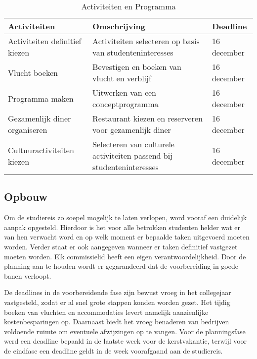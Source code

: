 \begin{table}[h!]
	\centering
	\caption{Activiteiten en Programma}
	\label{tab:activiteiten}
	\begin{tabular}{|p{4cm}|p{6cm}|p{5cm}|}
		\hline
		\textbf{Activiteiten} & \textbf{Omschrijving} & \textbf{Deadline} \\
		\hline
		Activiteiten definitief kiezen & Activiteiten selecteren op basis van studenteninteresses & 16 december \\
		\hline
		Vlucht boeken & Bevestigen en boeken van vlucht en verblijf & 16 december \\
		\hline
		Programma maken & Uitwerken van een conceptprogramma & 16 december \\
		\hline
		Gezamenlijk diner organiseren & Restaurant kiezen en reserveren voor gezamenlijk diner & 16 december \\
		\hline
		Cultuuractiviteiten kiezen & Selecteren van culturele activiteiten passend bij studenteninteresses & 16 december \\
		\hline
	\end{tabular}
\end{table}

\newpage

\subsection{Opbouw}

Om de studiereis zo soepel mogelijk te laten verlopen, word vooraf een duidelijk aanpak opgesteld. Hierdoor is het voor alle betrokken studenten helder wat er van hen verwacht word en op welk moment er bepaalde taken uitgevoerd moeten worden. Verder staat er ook aangegeven wanneer er taken definitief vastgezet moeten worden. Elk commissielid heeft een eigen verantwoordelijkheid. Door de planning aan te houden wordt er gegarandeerd dat de voorbereiding in goede banen verloopt. 

De deadlines in de voorbereidende fase zijn bewust vroeg in het collegejaar vastgesteld, zodat er al snel grote stappen konden worden gezet. Het tijdig boeken van vluchten en accommodaties levert namelijk aanzienlijke kostenbesparingen op. Daarnaast biedt het vroeg benaderen van bedrijven voldoende ruimte om eventuele afwijzingen op te vangen. Voor de planningsfase werd een deadline bepaald in de laatste week voor de kerstvakantie, terwijl voor de eindfase een deadline geldt in de week voorafgaand aan de studiereis.